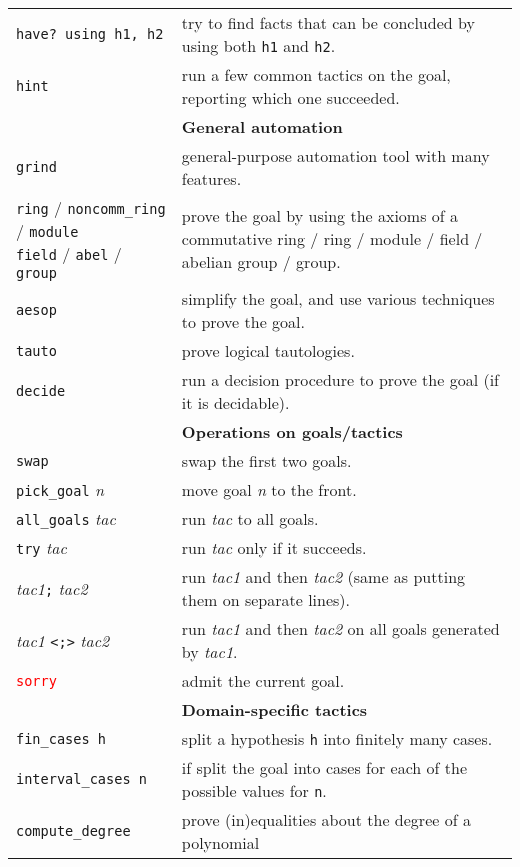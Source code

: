 \documentclass[a4paper]{article}
\newcommand{\lean}[1]{{\tt #1}}
\newcommand{\tactic}[1][]{\textit{tac#1}\xspace} %
\newcommand{\nat}{\textit{n}\xspace}
\begin{document}
\begin{center}
\begin{longtable}{@{}lp{113mm}@{}}
  \lean{have? using h1, h2} & try to find facts that can be concluded by using both \lean{h1} and \lean{h2}. \\
  \lean{hint} & run a few common tactics on the goal, reporting which one succeeded. \\
  \hline
  &\textbf{General automation}\\
  \lean{grind} & general-purpose automation tool with many features. \\
  \makecell[lt]{\lean{ring} / \lean{noncomm\_ring} / \lean{module} \\ \lean{field} / \lean{abel} / \lean{group}} & prove the goal by using the axioms of a commutative ring / ring / module / field / abelian group / group. \\
  \lean{aesop} & simplify the goal, and use various techniques to prove the goal. \\
  \lean{tauto} & prove logical tautologies. \\
  \lean{decide} & run a decision procedure to prove the goal (if it is decidable). \\
  \hline
  &\textbf{Operations on goals/tactics}\\
  \lean{swap} & swap the first two goals. \\
  \lean{pick\_goal} \nat & move goal \nat to the front. \\
  \lean{all\_goals} \tactic & run \tactic to all goals. \\
  \lean{try} \tactic & run \tactic only if it succeeds. \\
  \tactic[1]\lean{;} \tactic[2] & run \tactic[1] and then \tactic[2] (same as putting them on separate lines). \\
  \tactic[1] \lean{<;>} \tactic[2] & run \tactic[1] and then \tactic[2] on all goals generated by \tactic[1]. \\
  \textcolor{red}{\lean{sorry}} & admit the current goal.\\
  \hline
  &\textbf{Domain-specific tactics}\\
  \lean{fin\_cases h} & split a hypothesis \lean{h} into finitely many cases. \\
  \lean{interval\_cases n} & if split the goal into cases for each of the possible values for \lean{n}.\\
  \lean{compute\_degree} & prove (in)equalities about the degree of a polynomial \\

\end{longtable}
\end{center}
\end{document}
